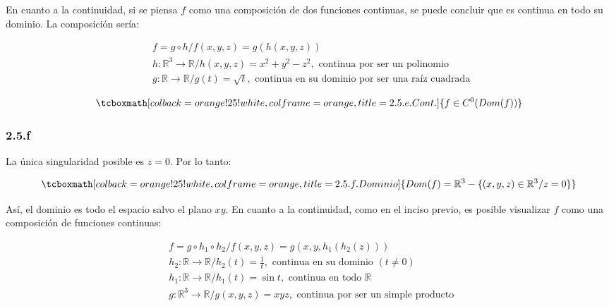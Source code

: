 \documentclass{article}
\renewcommand{\Bbb}{\mathbb}
\begin{document}
En cuanto a la continuidad, si se piensa $f$ como una composición de dos funciones continuas, se puede concluir que es continua en todo su dominio. La composición sería:

\begin{subequations}
\begin{align}
& f = g \circ h / f(x,y,z) = g(h(x,y,z)) \\
& h: \Bbb R^3 \rightarrow \Bbb R / h(x,y,z) = x^2 + y^2 - z^2, \text{ continua por ser un polinomio} \\
& g: \Bbb R \rightarrow \Bbb R / g(t) = \sqrt{t}, \text{ continua en su dominio por ser una raíz cuadrada }
\end{align}
\end{subequations}

\begin{equation}
\tcboxmath[colback=orange!25!white,colframe=orange,title=2.5.e. Cont. ]
{ f \in C^0(\mathop{Dom(f)}) }
\end{equation}

\subsubsection*{2.5.f}
\label{subsubsec:2.5.f}

La única singularidad posible es $z = 0$. Por lo tanto:

\begin{equation}
\tcboxmath[colback=orange!25!white,colframe=orange,title=2.5.f. Dominio ]
{ \mathop{Dom}(f) = \Bbb R^3 - \{ (x,y,z) \in \Bbb R^3 / z = 0 \} }
\end{equation}

Así, el dominio es todo el espacio salvo el plano $xy$. En cuanto a la continuidad, como en el inciso previo, es posible visualizar $f$ como una composición de funciones continuas:

\begin{subequations}
\begin{align}
& f = g \circ h_1 \circ h_2 / f(x,y,z) = g(x, y, h_1(h_2(z))) \\
& h_2: \Bbb R \rightarrow \Bbb R / h_2(t) = \frac{1}{t}, \text{ continua en su dominio } (t \neq 0) \\
& h_1: \Bbb R \rightarrow \Bbb R / h_1(t) = \sin{t}, \text{ continua en todo } \Bbb R \\
& g: \Bbb R^3 \rightarrow \Bbb R / g(x,y,z) = xyz, \text{ continua por ser un simple producto }
\end{align}
\end{subequations}
\end{document}

